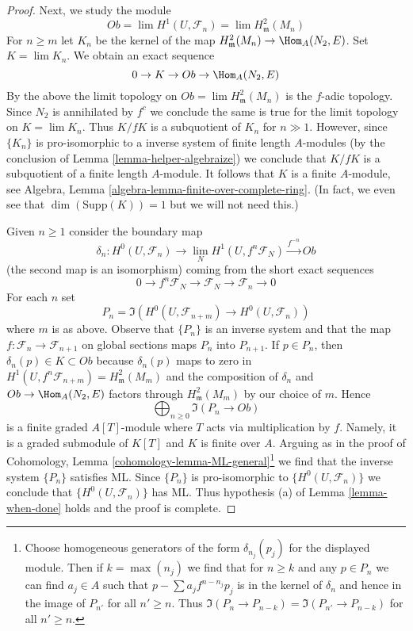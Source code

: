 \begin{proof}
\medskip\noindent
Next, we study the module
$$
Ob = \lim H^1(U, \mathcal{F}_n) = \lim H^2_\mathfrak m(M_n)
$$
For $n \geq m$ let $K_n$ be the kernel of the map
$H^2_\mathfrak m(M_n) \to \Hom_A(N_2, E)$.
Set $K = \lim K_n$. We obtain an exact sequence
$$
0 \to K \to Ob \to \Hom_A(N_2, E)
$$
By the above the limit topology on $Ob = \lim H^2_\mathfrak m(M_n)$
is the $f$-adic topology. Since $N_2$ is annihilated by $f^c$
we conclude the same is true for the limit topology on $K = \lim K_n$.
Thus $K/fK$ is a subquotient of $K_n$ for $n \gg 1$.
However, since $\{K_n\}$ is pro-isomorphic to a inverse system of
finite length $A$-modules (by the conclusion of
Lemma \ref{lemma-helper-algebraize})
we conclude that $K/fK$ is a subquotient of a finite length
$A$-module. It follows that $K$ is a finite $A$-module, see
Algebra, Lemma \ref{algebra-lemma-finite-over-complete-ring}.
(In fact, we even see that $\dim(\text{Supp}(K)) = 1$ but
we will not need this.)

\medskip\noindent
Given $n \geq 1$ consider the boundary map
$$
\delta_n :
H^0(U, \mathcal{F}_n)
\longrightarrow
\lim_N H^1(U, f^n\mathcal{F}_N) \xrightarrow{f^{-n}} Ob
$$
(the second map is an isomorphism)
coming from the short exact sequences
$$
0 \to f^n\mathcal{F}_N \to \mathcal{F}_N \to \mathcal{F}_n \to 0
$$
For each $n$ set
$$
P_n = \Im(H^0(U, \mathcal{F}_{n + m}) \to H^0(U, \mathcal{F}_n))
$$
where $m$ is as above. Observe that $\{P_n\}$ is an inverse
system and that the map $f : \mathcal{F}_n \to \mathcal{F}_{n + 1}$
on global sections maps $P_n$ into $P_{n + 1}$.
If $p \in P_n$, then $\delta_n(p) \in K \subset Ob$
because $\delta_n(p)$ maps to zero in
$H^1(U, f^n\mathcal{F}_{n + m}) = H^2_\mathfrak m(M_m)$
and the composition of $\delta_n$ and $Ob \to \Hom_A(N_2, E)$
factors through $H^2_\mathfrak m(M_m)$ by our choice of $m$.
Hence
$$
\bigoplus\nolimits_{n \geq 0} \Im(P_n \to Ob)
$$
is a finite graded $A[T]$-module where $T$ acts via multiplication by $f$.
Namely, it is a graded submodule of $K[T]$ and $K$ is finite over $A$.
Arguing as in the proof of
Cohomology, Lemma \ref{cohomology-lemma-ML-general}\footnote{Choose
homogeneous generators of the form $\delta_{n_j}(p_j)$ for the displayed
module. Then if $k = \max(n_j)$ we find that for $n \geq k$
and any $p \in P_n$ we can find $a_j \in A$ such that
$p - \sum a_j f^{n - n_j} p_j$ is in the kernel of $\delta_n$
and hence in the image of $P_{n'}$ for all $n' \geq n$.
Thus $\Im(P_n \to P_{n - k}) = \Im(P_{n'} \to P_{n - k})$
for all $n' \geq n$.}
we find that the inverse system $\{P_n\}$ satisfies ML.
Since $\{P_n\}$ is pro-isomorphic to $\{H^0(U, \mathcal{F}_n)\}$
we conclude that $\{H^0(U, \mathcal{F}_n)\}$ has ML.
Thus hypothesis (a) of Lemma \ref{lemma-when-done}
holds and the proof is complete.
\end{proof}

